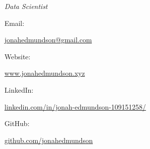 \documentclass[11pt, a4paper]{article}
\begin{document}
\noindent
\begin{minipage}{0.6\textwidth}
\normalsize
\par
\vspace{0.2pc}
\hspace{18.4pc}
\textit{Data Scientist}
\end{minipage}\hfill
\hspace{2pc}\begin{minipage}{0.4\textwidth}
\begin{flushright}
\footnotesize
\noindent Email: \par
\noindent \href{mailto:jonahedmundson@gmail.com}{\url{jonahedmundson@gmail.com}}
\par
\par
\noindent Website: \par
\noindent \href{www.jonahedmundson.xyz}{\url{www.jonahedmundson.xyz}}
\par
\par
\noindent LinkedIn: \par
\noindent \href{https://www.linkedin.com/in/jonah-edmundson-109151258/}{\url{linkedin.com/in/jonah-edmundson-109151258/}}
\par
\noindent GitHub: \par
\noindent \href{https://github.com/jonahedmundson}{\url{github.com/jonahedmundson}}

\end{flushright}
\end{minipage}



\normalsize
\noindent
\end{document}
